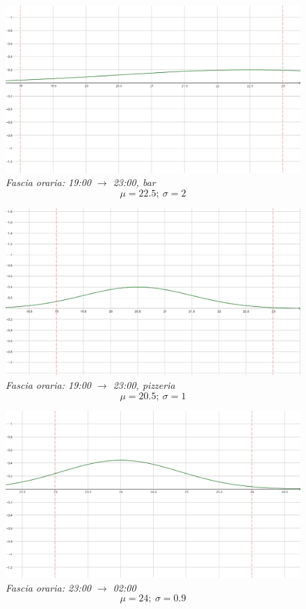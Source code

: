 \documentclass[a4paper, 12pt]{article}
\begin{document}
\begin{figure}
\includegraphics[width=\textwidth]{19-23-gaussian}
\centering \textit{Fascia oraria: 19:00 $\rightarrow$ 23:00, bar}
\[ \mu = 22.5;\ \sigma = 2 \]
\end{figure}

\begin{figure}
\includegraphics[width=\textwidth]{19-23-gaussian-pizza}
\centering \textit{Fascia oraria: 19:00 $\rightarrow$ 23:00, pizzeria}
\[ \mu = 20.5;\ \sigma = 1 \]
\end{figure}

\begin{figure}
\includegraphics[width=\textwidth]{23-02-gaussian}
\centering \textit{Fascia oraria: 23:00 $\rightarrow$ 02:00}
\[ \mu = 24;\ \sigma = 0.9 \]
\end{figure}
\end{document}
